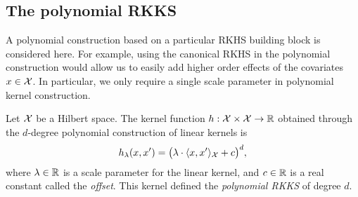 

\subsection{The polynomial RKKS}

A polynomial construction based on a particular RKHS building block is considered here.
For example, using the canonical RKHS in the polynomial construction would allow us to easily add higher order effects of the covariates $x \in {\mathcal X}$.
In particular, we only require a single scale parameter in polynomial kernel construction.

\begin{definition}
  Let ${\mathcal X}$ be a Hilbert space.
  The kernel function $h:{\mathcal X}\times{\mathcal X}\to\mathbb{R}$ obtained through the $d$-degree polynomial construction of linear kernels is
  \[
    h_\lambda(x,x') = \big(\lambda\cdot\langle x,x'\rangle_{\mathcal X} + c\big)^d,
  \]
  where $\lambda \in \mathbb{R}$ is a scale parameter for the linear kernel, and $c \in \mathbb{R}$ is a real constant called the \emph{offset}.
  This kernel defined the \emph{polynomial RKKS} of degree $d$.
\end{definition}

